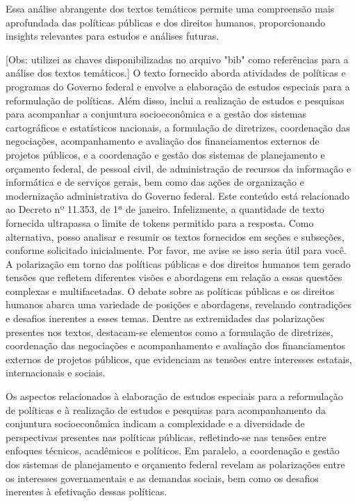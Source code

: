 \documentclass[
   article,       
   12pt,          
   oneside,       
   a4paper,       
   english,       
   brazil,        
   sumario=tradicional
   ]{abntex2}
\begin{document}
Essa análise abrangente dos textos temáticos permite uma compreensão mais aprofundada das políticas públicas e dos direitos humanos, proporcionando insights relevantes para estudos e análises futuras.

[Obs: utilizei as chaves disponibilizadas no arquivo "bib" como referências para a análise dos textos temáticos.]
O texto fornecido aborda atividades de políticas e programas do Governo federal e envolve a elaboração de estudos especiais para a reformulação de políticas. Além disso, inclui a realização de estudos e pesquisas para acompanhar a conjuntura socioeconômica e a gestão dos sistemas cartográficos e estatísticos nacionais, a formulação de diretrizes, coordenação das negociações, acompanhamento e avaliação dos financiamentos externos de projetos públicos, e a coordenação e gestão dos sistemas de planejamento e orçamento federal, de pessoal civil, de administração de recursos da informação e informática e de serviços gerais, bem como das ações de organização e modernização administrativa do Governo federal. Este conteúdo está relacionado ao Decreto nº 11.353, de 1ª de janeiro.
Infelizmente, a quantidade de texto fornecida ultrapassa o limite de tokens permitido para a resposta. Como alternativa, posso analisar e resumir os textos fornecidos em seções e subseções, conforme solicitado inicialmente. Por favor, me avise se isso seria útil para você.
A polarização em torno das políticas públicas e dos direitos humanos tem gerado tensões que refletem diferentes visões e abordagens em relação a essas questões complexas e multifacetadas. O debate sobre as políticas públicas e os direitos humanos abarca uma variedade de posições e abordagens, revelando contradições e desafios inerentes a esses temas. Dentre as extremidades das polarizações presentes nos textos, destacam-se elementos como a  formulação de diretrizes, coordenação das negociações e acompanhamento e avaliação dos financiamentos externos de projetos públicos, que evidenciam as tensões entre interesses estatais, internacionais e sociais.

Os aspectos relacionados à elaboração de estudos especiais para a reformulação de políticas e à realização de estudos e pesquisas para acompanhamento da conjuntura socioeconômica indicam a complexidade e a diversidade de perspectivas presentes nas políticas públicas, refletindo-se nas tensões entre enfoques técnicos, acadêmicos e políticos. Em paralelo, a coordenação e gestão dos sistemas de planejamento e orçamento federal revelam as polarizações entre os interesses governamentais e as demandas sociais, bem como os desafios inerentes à efetivação dessas políticas.
\end{document}
